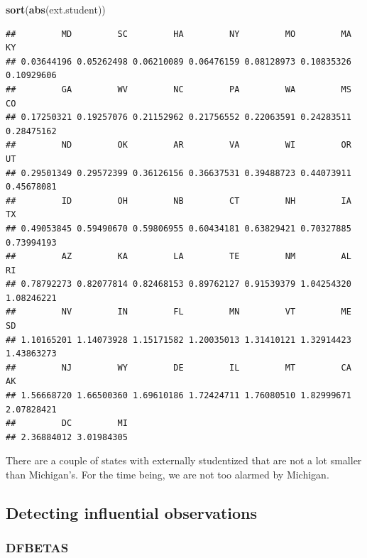 \documentclass[
]{book}
\newenvironment{Shaded}{\begin{snugshade}}{\end{snugshade}}
\newcommand{\FunctionTok}[1]{\textcolor[rgb]{0.13,0.29,0.53}{\textbf{#1}}}
\newcommand{\NormalTok}[1]{#1}
\begin{document}
\begin{Shaded}
\begin{Highlighting}[]
\FunctionTok{sort}\NormalTok{(}\FunctionTok{abs}\NormalTok{(ext.student))}
\end{Highlighting}
\end{Shaded}

\begin{verbatim}
##         MD         SC         HA         NY         MO         MA         KY 
## 0.03644196 0.05262498 0.06210089 0.06476159 0.08128973 0.10835326 0.10929606 
##         GA         WV         NC         PA         WA         MS         CO 
## 0.17250321 0.19257076 0.21152962 0.21756552 0.22063591 0.24283511 0.28475162 
##         ND         OK         AR         VA         WI         OR         UT 
## 0.29501349 0.29572399 0.36126156 0.36637531 0.39488723 0.44073911 0.45678081 
##         ID         OH         NB         CT         NH         IA         TX 
## 0.49053845 0.59490670 0.59806955 0.60434181 0.63829421 0.70327885 0.73994193 
##         AZ         KA         LA         TE         NM         AL         RI 
## 0.78792273 0.82077814 0.82468153 0.89762127 0.91539379 1.04254320 1.08246221 
##         NV         IN         FL         MN         VT         ME         SD 
## 1.10165201 1.14073928 1.15171582 1.20035013 1.31410121 1.32914423 1.43863273 
##         NJ         WY         DE         IL         MT         CA         AK 
## 1.56668720 1.66500360 1.69610186 1.72424711 1.76080510 1.82999671 2.07828421 
##         DC         MI 
## 2.36884012 3.01984305
\end{verbatim}

There are a couple of states with externally studentized that are not a lot smaller than Michigan's. For the time being, we are not too alarmed by Michigan.

\hypertarget{detecting-influential-observations}{%
\subsection*{Detecting influential observations}\label{detecting-influential-observations}}

\hypertarget{dfbetas-1}{%
\subsubsection*{DFBETAS}\label{dfbetas-1}}
\end{document}
